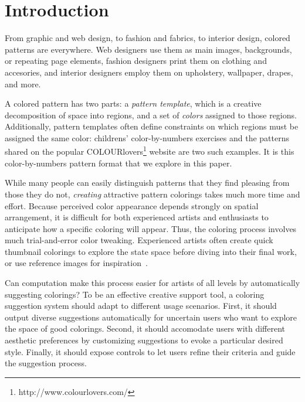 \section{Introduction}
\label{sec:introduction}

From graphic and web design, to fashion and fabrics, to interior design, colored patterns are everywhere. Web designers use them as main images, backgrounds, or repeating page elements, fashion designers print them on clothing and accesories, and interior designers employ them on upholstery, wallpaper, drapes, and more.

A colored pattern has two parts: a \emph{pattern template}, which is a creative decomposition of space into regions, and a set of \emph{colors} assigned to those regions.
Additionally, pattern templates often define constraints on which regions must be assigned the same color: childrens' color-by-numbers exercises and the patterns shared on the popular COLOURlovers\footnote{http://www.colourlovers.com/} website are two such examples. It is this color-by-numbers pattern format that we explore in this paper.

While many people can easily distinguish patterns that they find pleasing from those they do not, \emph{creating} attractive pattern colorings takes much more time and effort. Because perceived color appearance depends strongly on spatial arrangement, it is difficult for both experienced artists and enthusiasts to anticipate how a specific coloring will appear. Thus, the coloring process involves much trial-and-error color tweaking. Experienced artists often create quick thumbnail colorings to explore the state space before diving into their final work, or use reference images for inspiration~\cite{ColorPaletteTools}.

Can computation make this process easier for artists of all levels by automatically suggesting colorings? To be an effective creative support tool, a coloring suggestion system should adapt to different usage scenarios. First, it should output diverse suggestions automatically for uncertain users who want to explore the space of good colorings. Second, it should accomodate users with different aesthetic preferences by customizing suggestions to evoke a particular desired style. Finally, it should expose controls to let users refine their criteria and guide the suggestion process. 


